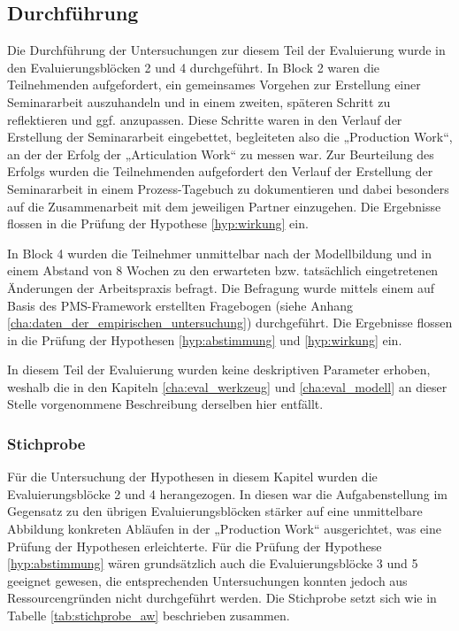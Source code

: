 
\subsection{Durchführung} %
\label{sub:a_durchführung}

Die Durchführung der Untersuchungen zur diesem Teil der Evaluierung wurde in den Evaluierungsblöcken 2 und 4 durchgeführt. In Block 2 waren die Teilnehmenden aufgefordert, ein gemeinsames Vorgehen zur Erstellung einer Seminararbeit auszuhandeln und in einem zweiten, späteren Schritt zu reflektieren und ggf. anzupassen. Diese Schritte waren in den Verlauf der Erstellung der Seminararbeit eingebettet, begleiteten also die „Production Work“, an der der Erfolg der „Articulation Work“ zu messen war. Zur Beurteilung des Erfolgs wurden die Teilnehmenden aufgefordert den Verlauf der Erstellung der Seminararbeit in einem Prozess-Tagebuch zu dokumentieren und dabei besonders auf die Zusammenarbeit mit dem jeweiligen Partner einzugehen. Die Ergebnisse flossen in die Prüfung der Hypothese \ref{hyp:wirkung} ein.

In Block 4 wurden die Teilnehmer unmittelbar nach der Modellbildung und in einem Abstand von 8 Wochen zu den erwarteten bzw. tatsächlich eingetretenen Änderungen der Arbeitspraxis befragt. Die Befragung wurde mittels einem auf Basis des \gls{PMS}-Framework erstellten Fragebogen (siehe Anhang \ref{cha:daten_der_empirischen_untersuchung}) durchgeführt. Die Ergebnisse flossen in die Prüfung der Hypothesen \ref{hyp:abstimmung} und \ref{hyp:wirkung} ein.

In diesem Teil der Evaluierung wurden keine deskriptiven Parameter erhoben, weshalb die in den Kapiteln \ref{cha:eval_werkzeug} und \ref{cha:eval_modell} an dieser Stelle vorgenommene Beschreibung derselben hier entfällt.

\subsubsection{Stichprobe} %

Für die Untersuchung der Hypothesen in diesem Kapitel wurden die Evaluierungsblöcke 2 und 4 herangezogen.  In diesen war die Aufgabenstellung im Gegensatz zu den übrigen Evaluierungsblöcken stärker auf eine unmittelbare Abbildung konkreten Abläufen in der „Production Work“ ausgerichtet, was eine Prüfung der Hypothesen erleichterte. Für die Prüfung der Hypothese \ref{hyp:abstimmung} wären grundsätzlich auch die Evaluierungsblöcke 3 und 5 geeignet gewesen, die entsprechenden Untersuchungen konnten jedoch aus Ressourcengründen nicht durchgeführt werden. Die Stichprobe setzt sich wie in Tabelle \ref{tab:stichprobe_aw} beschrieben zusammen.

